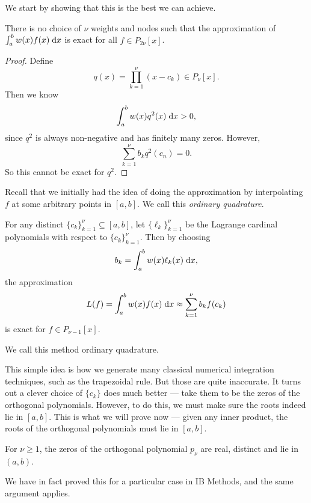 \documentclass[a4paper]{article}
\begin{document}
We start by showing that this is the best we can achieve.
\begin{prop}
  There is no choice of $\nu$ weights and nodes such that the approximation of $\int_a^b w(x) f(x)\;\mathrm{d} x$ is exact for all $f \in P_{2\nu}[x]$.
\end{prop}

\begin{proof}
  Define
  \[
    q(x) = \prod_{k = 1}^{\nu} (x - c_k) \in P_{\nu}[x].
  \]
  Then we know
  \[
    \int_a^b w(x) q^2(x)\;\mathrm{d} x > 0,
  \]
  since $q^2$ is always non-negative and has finitely many zeros. However,
  \[
    \sum_{k = 1}^\nu b_k q^2(c_n) = 0.
  \]
  So this cannot be exact for $q^2$.
\end{proof}

Recall that we initially had the idea of doing the approximation by interpolating $f$ at some arbitrary points in $[a, b]$. We call this \emph{ordinary quadrature}.
\begin{thm}
  For any distinct $\{c_k\}_{k = 1}^\nu \subseteq [a, b]$, let $\{\ell_k\}_{k = 1}^\nu$ be the Lagrange cardinal polynomials with respect to $\{c_k\}_{k = 1}^\nu$. Then by choosing
  \[
    b_k = \int_a^b w(x) \ell_k(x) \;\mathrm{d} x,
  \]
  the approximation
  \[
    L(f) = \int_a^b w(x) f(x)\;\mathrm{d} x \approx \sum_{k = 1}^\nu b_k f(c_k)
  \]
  is exact for $f \in P_{\nu - 1}[x]$.

  We call this method ordinary quadrature.
\end{thm}
This simple idea is how we generate many classical numerical integration techniques, such as the trapezoidal rule. But those are quite inaccurate. It turns out a clever choice of $\{c_k\}$ does much better --- take them to be the zeros of the orthogonal polynomials. However, to do this, we must make sure the roots indeed lie in $[a, b]$. This is what we will prove now --- given any inner product, the roots of the orthogonal polynomials must lie in $[a, b]$.

\begin{thm}
  For $\nu \geq 1$, the zeros of the orthogonal polynomial $p_\nu$ are real, distinct and lie in $(a, b)$.
\end{thm}
We have in fact proved this for a particular case in IB Methods, and the same argument applies.
\end{document}
